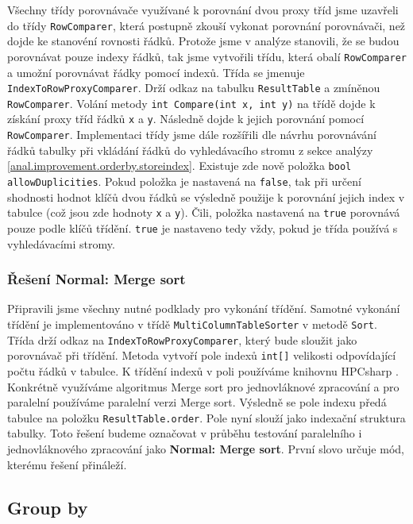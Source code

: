 Všechny třídy porovnávače využívané k porovnání dvou proxy tříd jsme uzavřeli do třídy \texttt{RowComparer}, která postupně zkouší vykonat porovnání porovnávači, než dojde ke stanovéní rovnosti řádků.
Protože jsme v analýze stanovili, že se budou porovnávat pouze indexy řádků, tak jsme vytvořili třídu, která obalí \texttt{RowComparer} a umožní porovnávat řádky pomocí indexů. 
Třída se jmenuje \texttt{IndexToRowProxyComparer}.
Drží odkaz na tabulku \texttt{ResultTable} a zmíněnou \texttt{RowComparer}.
Volání metody \texttt{int Compare(int x, int y)} na třídě dojde k získání proxy tříd řádků \texttt{x} a \texttt{y}.
Následně dojde k jejich porovnání pomocí \texttt{RowComparer}.
Implementaci třídy jsme dále rozšířili dle návrhu porovnávání řádků tabulky při vkládání řádků do vyhledávacího stromu z sekce analýzy \ref{anal.improvement.orderby.storeindex}.
Existuje zde nově položka \texttt{bool allowDuplicities}.
Pokud položka je nastavená na \texttt{false}, tak při určení shodnosti hodnot klíčů dvou řádků se výsledně použije k porovnání jejich index v tabulce (což jsou zde hodnoty \texttt{x} a \texttt{y}).
Čili, položka nastavená na \texttt{true} porovnává pouze podle klíčů třídění.
\texttt{true} je nastaveno tedy vždy, pokud je třída používá s vyhledávacími stromy. 

\subsubsection{Řešení Normal: Merge sort}

Připravili jsme všechny nutné podklady pro vykonání třídění.
Samotné vykonání třídění je implementováno v třídě \texttt{MultiColumnTableSorter} v metodě \texttt{Sort}.
Třída drží odkaz na \texttt{IndexToRowProxyComparer}, který bude sloužit jako porovnávač při třídění.
Metoda vytvoří pole indexů \texttt{int[]} velikosti odpovídající počtu řádků v tabulce.
K třídění indexů v poli používáme knihovnu HPCsharp \citep{hpcsharp}.
Konkrétně využíváme algoritmus Merge sort pro jednovláknové zpracování a pro paralelní používáme paralelní verzi Merge sort.
Výsledně se pole indexu předá tabulce na položku \texttt{ResultTable.order}.
Pole nyní slouží jako indexační struktura tabulky.
Toto řešení budeme označovat v průběhu testování paralelního i jednovláknového zpracování jako \textbf{Normal: Merge sort}.
První slovo určuje mód, kterému řešení přináleží.

\subsection{Group by}

